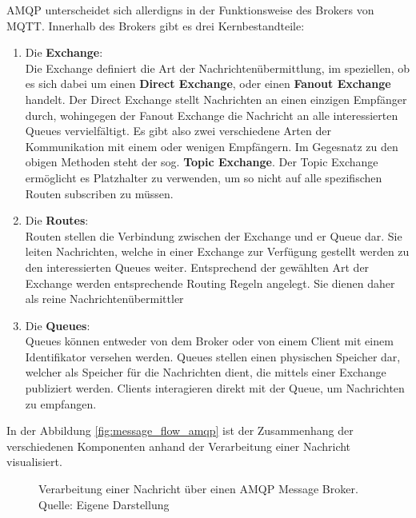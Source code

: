 \ac{AMQP} unterscheidet sich allerdigns in der Funktionsweise des Brokers von \ac{MQTT}. Innerhalb des Brokers gibt es drei Kernbestandteile:
\begin{enumerate}
    \item Die \textbf{Exchange}:\\
    Die Exchange definiert die Art der Nachrichtenübermittlung, im speziellen, ob es sich dabei um einen \textbf{Direct Exchange}, oder einen \textbf{Fanout Exchange} handelt. Der Direct Exchange stellt Nachrichten an einen einzigen Empfänger durch, wohingegen der Fanout Exchange die Nachricht an alle interessierten Queues vervielfältigt. Es gibt also zwei verschiedene Arten der Kommunikation mit einem oder wenigen Empfängern. Im Gegesnatz zu den obigen Methoden steht der sog. \textbf{Topic Exchange}. Der Topic Exchange ermöglicht es Platzhalter zu verwenden, um so nicht auf alle spezifischen Routen subscriben zu müssen.
    \item Die \textbf{Routes}:\\
    Routen stellen die Verbindung zwischen der Exchange und er Queue dar. Sie leiten Nachrichten, welche in einer Exchange zur Verfügung gestellt werden zu den interessierten Queues weiter. Entsprechend der gewählten Art der Exchange werden entsprechende Routing Regeln angelegt. Sie dienen daher als reine Nachrichtenübermittler
    \item Die \textbf{Queues}:\\
    Queues können entweder von dem Broker oder von einem Client mit einem Identifikator versehen werden. Queues stellen einen physischen Speicher dar, welcher als Speicher für die Nachrichten dient, die mittels einer Exchange publiziert werden. Clients interagieren direkt mit der Queue, um Nachrichten zu empfangen.
\end{enumerate}

In der Abbildung \vref{fig:message_flow_amqp} ist der Zusammenhang der verschiedenen Komponenten anhand der Verarbeitung einer Nachricht visualisiert.

\begin{figure}
    \centering
    \caption{Verarbeitung einer Nachricht über einen \ac{AMQP} Message Broker.\\Quelle: Eigene Darstellung}
    \label{fig:message_flow_amqp}
\end{figure}

